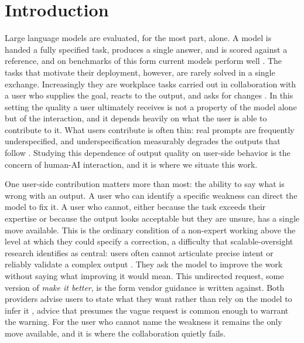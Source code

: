 \section{Introduction}


Large language models are evaluated, for the most part, alone. A model is handed a fully specified
task, produces a single answer, and is scored against a reference, and on benchmarks of this form
current models perform well \cite{liang2023holistic}. The tasks that motivate their deployment,
however, are rarely solved in a single exchange. Increasingly they are workplace tasks carried out
in collaboration with a user who supplies the goal, reacts to the output, and asks for changes
\cite{anthropic2025economicindex, laban2025lost}. In this setting the quality a user ultimately
receives is not a property of the model alone but of the interaction, and it depends heavily on what
the user is able to contribute to it. What users contribute is often thin: real prompts are
frequently underspecified, and underspecification measurably degrades the outputs that follow
\cite{yang2025underspecification}. Studying this dependence of output quality on user-side behavior
is the concern of human-AI interaction, and it is where we situate this work.

One user-side contribution matters more than most: the ability to say what is wrong with an output.
A user who can identify a specific weakness can direct the model to fix it. A user who cannot, either
because the task exceeds their expertise or because the output looks acceptable but they are unsure,
has a single move available. This is the ordinary condition of a non-expert working above the level
at which they could specify a correction, a difficulty that scalable-oversight research identifies as
central: users often cannot articulate precise intent or reliably validate a complex output
\cite{zhou2026oversight}. They ask the model to improve the work without saying what improving it
would mean. This undirected request, some version of \emph{make it better}, is the form vendor guidance is
written against. Both providers advise users to state what they want rather than rely on the model
to infer it \cite{openai2025prompting, anthropic2025prompting}, advice that presumes the vague
request is common enough to warrant the warning. For the user who cannot name the weakness it
remains the only move available, and it is where the collaboration quietly fails.

